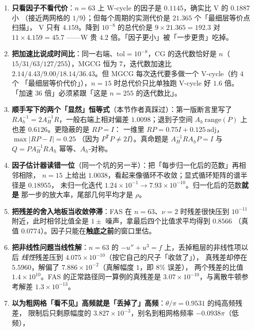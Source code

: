 \begin{enumerate}
        而且把最优常数 $c$ 调到最好，$\|R_{\rm inj}-cP^{\mathsf T}\|$ 仍有 $0.5$ 量级。
  \item \textbf{只看因子不看代价}：$n=63$ 上 W-cycle 的因子是 $0.1145$，确实比 V 的 $0.1887$ 小
        （接近两网格的 $1/9$）；但每个周期的实测代价是 $21.365$ 个「最细层等价点扫描」，
        V 只有 $4.159$。降到 $10^{-8}$ 的总代价是 $9\times21.365=192.3$ 对 $11\times4.159=45.7$
        ——W 贵 $4.2$ 倍。「因子更小」被「一步更贵」吃掉。
  \item \textbf{把加速比说成时间比}：同一右端、$\mathrm{tol}=10^{-8}$，CG 的迭代数恰好是
        $n$（$15/31/63/127/255$），MGCG 恒为 $7$，迭代数加速比
        $2.14/4.43/9.00/18.14/36.43$。但 MGCG 每次迭代要多做一个 V-cycle（约 $4$ 个
        「最细层等价代价」），$n=15$ 时总代价只比单独跑 V-cycle 好 $1.6$ 倍。
        「加速 $36$ 倍」必须紧跟「这是 $n=255$ 的迭代数比」。
  \item \textbf{顺手写下的两个「显然」恒等式}（本节作者真踩过）：第一版断言里写了
        $RA_h^{-1}=2A_H^{-1}R$，一般右端上相对偏差 $1.0098$；退到子空间
        $A_h\,\mathrm{range}(P)$ 上也差 $0.6126$。更隐蔽的是 $RP=I$：
        一维里 $RP=0.75I+0.125\,\mathrm{adj}$，$\max|RP-I|=0.25$
        （因为 $P^{\mathsf T}P\ne2I$）。真命题是 $A_H^{-1}RA_hP=I$ 与
        $Q=PA_H^{-1}RA_h$ 幂等、$A_h$-对称。
  \item \textbf{因子估计器读错一位}（同一个坑的另一半）：把「每步归一化后的范数」再相邻相除，
        $n=15$ 上给出 $1.0038$，看起来像循环不收敛；显式循环矩阵的谱半径是 $0.18955$，
        未归一化迭代 $1.24\times10^{-1}\to7.93\times10^{-10}$。归一化后的范数\textbf{就是}
        那一步的放大率，尾部几何平均才是 $\rho$。
  \item \textbf{把残差的舍入地板当收敛停滞}：FAS 在 $n=63$、$\nu=2$ 时残差很快压到
        $10^{-11}$ 附近，此时相邻比值全是 $1\pm$ 噪声，拿最后四个比值求平均得到 $0.8566$
        （真值 $0.0774$）。因子只能在\textbf{触底之前}的窗口里估。
  \item \textbf{把非线性问题当线性解}：$n=63$ 的 $-u''+u^3=f$ 上，丢掉粗层的非线性项以后
        \emph{线性}残差压到 $4.075\times10^{-10}$（按它自己的尺子「收敛了」），
        真残差却停在 $5.5960$，解偏了 $7.886\times10^{-2}$（真解幅度 $1$，即 $8\%$ 误差），
        两个残差的比值 $1.4\times10^{10}$。FAS 的正常路径同一算例的真残差是
        $3.07\times10^{-10}$，与离散牛顿参考解差 $1.3\times10^{-13}$。
  \item \textbf{以为粗网格「看不见」高频就是「丢掉了」高频}：$\theta/\pi=0.9531$ 的纯高频残差，
        限制后只剩原幅度的 $3.827\times10^{-3}$，别名到粗网格频率 $-0.0938\pi$（低频），

\end{enumerate}
